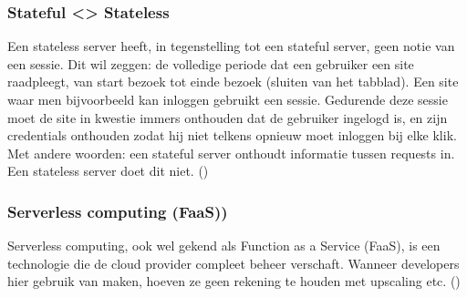 \subsubsection{Stateful <> Stateless}
Een stateless server heeft, in tegenstelling tot een stateful server, geen notie van een sessie. Dit wil zeggen: de volledige periode dat een gebruiker een site raadpleegt, van start bezoek tot einde bezoek (sluiten van het tabblad). Een site waar men bijvoorbeeld kan inloggen gebruikt een sessie. Gedurende deze sessie moet de site in kwestie immers onthouden dat de gebruiker ingelogd is, en zijn credentials onthouden zodat hij niet telkens opnieuw moet inloggen bij elke klik. Met andere woorden: een stateful server onthoudt informatie tussen requests in. Een stateless server doet dit niet. (\textcite{Subhash2009}) 

\subsubsection{Serverless computing (FaaS))}
Serverless computing, ook wel gekend als Function as a Service (FaaS), is een technologie die de cloud provider compleet beheer verschaft. Wanneer developers hier gebruik van maken, hoeven ze geen rekening te houden met upscaling etc. (\textcite{Chowan2018})







